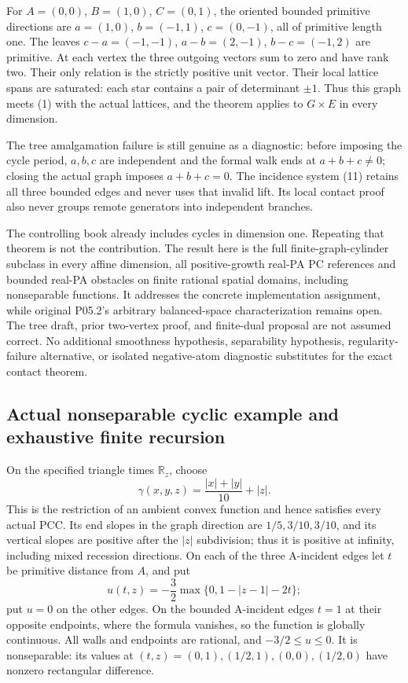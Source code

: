 \documentclass[
  11pt,
]{article}
\begin{document}
For \(A=(0,0)\), \(B=(1,0)\), \(C=(0,1)\), the oriented bounded
primitive directions are \(a=(1,0)\), \(b=(-1,1)\), \(c=(0,-1)\), all of
primitive length one. The leaves \(c-a=(-1,-1)\), \(a-b=(2,-1)\),
\(b-c=(-1,2)\) are primitive. At each vertex the three outgoing vectors
sum to zero and have rank two. Their only relation is the strictly
positive unit vector. Their local lattice spans are saturated: each star
contains a pair of determinant \(\pm1\). Thus this graph meets (1) with
the actual lattices, and the theorem applies to \(G\times E\) in every
dimension.

The tree amalgamation failure is still genuine as a diagnostic: before
imposing the cycle period, \(a,b,c\) are independent and the formal walk
ends at \(a+b+c\ne0\); closing the actual graph imposes \(a+b+c=0\). The
incidence system (11) retains all three bounded edges and never uses
that invalid lift. Its local contact proof also never groups remote
generators into independent branches.

The controlling book already includes cycles in dimension one. Repeating
that theorem is not the contribution. The result here is the full
finite-graph-cylinder subclass in every affine dimension, all
positive-growth real-PA PC references and bounded real-PA obstacles on
finite rational spatial domains, including nonseparable functions. It
addresses the concrete implementation assignment, while original P05.2's
arbitrary balanced-space characterization remains open. The tree draft,
prior two-vertex proof, and finite-dual proposal are not assumed
correct. No additional smoothness hypothesis, separability hypothesis,
regularity-failure alternative, or isolated negative-atom diagnostic
substitutes for the exact contact theorem.

\subsection{Actual nonseparable cyclic example and exhaustive finite
recursion}\label{actual-nonseparable-cyclic-example-and-exhaustive-finite-recursion}

On the specified triangle times \(\mathbb{R}_z\), choose \[
 \gamma(x,y,z)=\frac{|x|+|y|}{10}+|z|.
\] This is the restriction of an ambient convex function and hence
satisfies every actual PCC. Its end slopes in the graph direction are
\(1/5,3/10,3/10\), and its vertical slopes are positive after the
\(|z|\) subdivision; thus it is positive at infinity, including mixed
recession directions. On each of the three A-incident edges let \(t\) be
primitive distance from \(A\), and put \[
 u(t,z)=-\frac32\max\{0,1-|z-1|-2t\};
\] put \(u=0\) on the other edges. On the bounded A-incident edges
\(t=1\) at their opposite endpoints, where the formula vanishes, so the
function is globally continuous. All walls and endpoints are rational,
and \(-3/2\leq u\leq0\). It is nonseparable: its values at
\((t,z)=(0,1),(1/2,1),(0,0),(1/2,0)\) have nonzero rectangular
difference.
\end{document}
